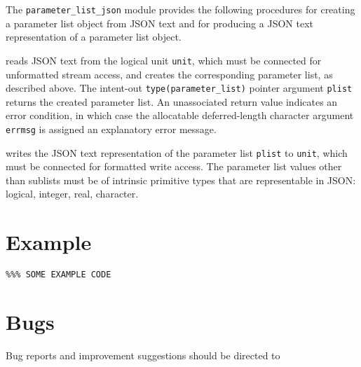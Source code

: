 \documentclass[11pt]{article}
\begin{document}
The \texttt{parameter_list_json} module provides the following procedures
for creating a parameter list object from JSON text and for producing a JSON
text representation of a parameter list object.

\begin{description}[style=nextline]\setlength{\itemsep}{0pt}
\item[\texttt{call parameter_list_from_json_stream (unit, plist, errmsg)}]
  reads JSON text from the logical unit \texttt{unit}, which must be
  connected for unformatted stream access, and creates the corresponding
  parameter list, as described above.  The intent-out \texttt{type(parameter_list)}
  pointer argument \texttt{plist} returns the created parameter list.  An
  unassociated return value indicates an error condition, in which case the
  allocatable deferred-length character argument \texttt{errmsg} is assigned
  an explanatory error message.
\item[\texttt{call parameter_list_to_json (plist, unit)}]
  writes the JSON text representation of the parameter list \texttt{plist}
  to \texttt{unit}, which must be connected for formatted write access.
  The parameter list values other than sublists must be of intrinsic primitive
  types that are representable in JSON: logical, integer, real, character.
\end{description}

\section{Example}
\begin{verbatim}
%%% SOME EXAMPLE CODE
\end{verbatim}

\section{Bugs}
Bug reports and improvement suggestions should be directed to

\LatexManEnd
\end{document}
